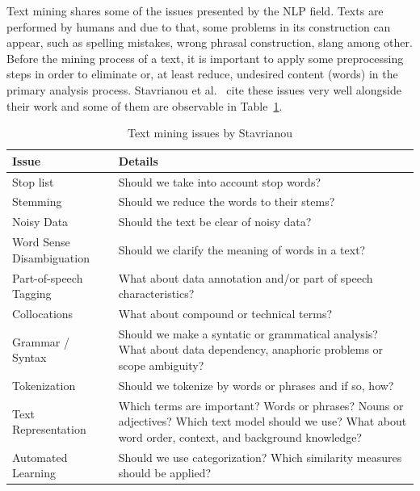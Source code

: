 Text mining shares some of the issues presented by the \gls{NLP} field. Texts are performed by humans and due to that, some problems in its construction can appear, such as spelling mistakes, wrong phrasal construction, slang among other. Before the mining process of a text, it is important to apply some preprocessing steps in order to eliminate or, at least reduce, undesired content (words) in the primary analysis process.
Stavrianou et al.~\cite{kn:Stavrianou2007} cite these issues very well alongside their work and some of them are observable in Table~\ref{table:textminingissues}.

\begin{table}[htbp]
	\centering
	\caption{Text mining issues by Stavrianou \cite{kn:Stavrianou2007}}
	\label{table:textminingissues}
	\begin{tabular}{ | l | p{7cm} |}
		\hline \textbf{Issue}            & \textbf{Details}\\
		\hline Stop list                 & Should we take into account stop words?\\ 
		\hline Stemming                  & Should we reduce the words to their stems?\\ 
		\hline Noisy Data                & Should the text be clear of noisy data?\\ 
		\hline Word Sense Disambiguation & Should we clarify the meaning of words in a text?\\ 
		\hline Part-of-speech Tagging    & What about data annotation and/or part of speech characteristics?\\ 
		\hline Collocations              & What about compound or technical terms?\\ 
		\hline Grammar / Syntax          & Should we make a syntatic or grammatical analysis? What about data dependency, anaphoric problems or scope ambiguity?\\ 
		\hline Tokenization              & Should we tokenize by words or phrases and if so, how?\\ 
		\hline Text Representation       & Which terms are important? Words or phrases? Nouns or adjectives? Which text model should we use? What about word order, context, and background knowledge? \\ 
		\hline Automated Learning        & Should we use categorization? Which similarity measures should be applied? \\ \hline
	\end{tabular}
\end{table}

